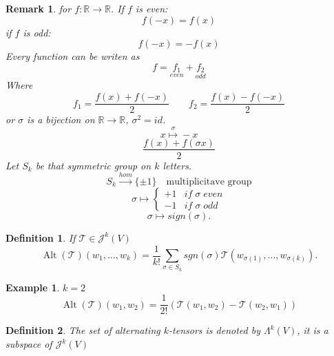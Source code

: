 \documentclass[11pt]{article}
\def\mat{\mathcal{T}}
\def\RR{\mathbb{R}}
\DeclareMathOperator{\alt}{Alt}
\newtheorem{definition}{Definition}[section]
\newtheorem{example}{Example}[section]
\newtheorem*{remark}{Remark}
\begin{document}
\begin{remark}
for $f:\RR \rightarrow \RR$. If $f$ is even:
\[f(-x) = f(x)\]
if $f$ is odd:
\[f(-x) = -f(x)\]
Every function can be writen as
\[f = \underset{even}{f_1} + \underset{odd}{f_2}\]
Where
\[f_1 = \frac{f(x) + f(-x)}{2} \qquad f_2=\frac{f(x) - f(-x)}{2}\]
or $\sigma$ is a bijection on $\RR \rightarrow \RR$, $\sigma^2 = id$.
\[x \overset{\sigma}{\mapsto} -x\]
\[\frac{f(x) +  f(\sigma x)}{2}\]
Let $S_k$ be that symmetric group on $k$ letters.
\[S_k \overset{hom}{\rightarrow}\{\pm 1\} \quad \text{multiplicitave group}\]
\[ \sigma \mapsto \begin{cases} +1 & if \; \sigma \; even \\
-1 & if \; \sigma \; odd \end{cases}\]
\[\sigma \mapsto sign(\sigma).\]
\end{remark}

\begin{definition}
If $\mathcal{T} \in \mathcal{J}^k(V)$
\[\alt(\mathcal{T})(w_1, \dots , w_k) = \frac{1}{k!}\sum\limits_{\sigma \in S_k} sgn(\sigma)\mat(w_{\sigma(1)}, \dots , w_{\sigma(k)}).\]
\end{definition}

\begin{example}
$k=2$
\[\alt(\mathcal{T})(w_1 , w_2) = \frac{1}{2!}(\mat(w_1, w_2) - \mat(w_2, w_1))\]
\end{example}

\begin{definition}
The set of alternating $k$-tensors is denoted by $\Lambda^k(V)$, it is a subspace of $\mathcal{J}^k(V)$ 
\end{definition}
\end{document}
